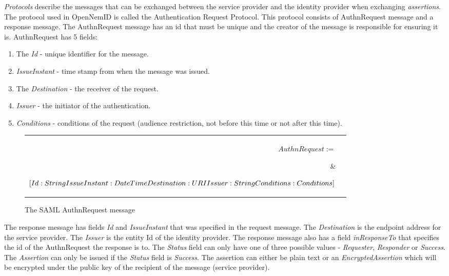 \documentclass[twosided]{report}
\begin{document}
\emph{Protocols} describe the messages that can be exchanged between the service provider and the identity provider when exchanging \emph{assertions}. The protocol used in OpenNemID is called the Authentication Request Protocol. This protocol consists of AuthnRequest message and a response message. The AuthnRequest message has an id that must be unique and the creator of the message is responsible for ensuring it is.
AuthnRequest has 5 fields:
\begin{enumerate}
	\item The \emph{Id} - unique identifier for the message.
	\item \emph{IssueInstant} - time stamp from when the message was issued.
	\item The \emph{Destination} - the receiver of the request.
	\item \emph{Issuer} - the initiator of the authentication.
	\item \emph{Conditions} - conditions of the request (audience restriction, not before this time or not after this time).
\end{enumerate}

\begin{figure}[H]
	\centering
	\begin{tabular}{r l}
	    \parbox[t][][t]{2.4cm}{\raggedleft $AuthnRequest :=$} &
	    \parbox[t][][t]{4.2cm}{
			$[Id : String\\
			IssueInstant : DateTime\\
			Destination : URI\\
			Issuer : String\\
			Conditions : Conditions]$} \\
	\end{tabular}
	\caption{The SAML AuthnRequest message}
\end{figure}

\par
The response message has fields \emph{Id} and \emph{IssueInstant} that was specified in the request message. The \emph{Destination} is the endpoint address for the service provider. The \emph{Issuer} is the entity Id of the identity provider. The response message also has a field \emph{inResponseTo} that specifies the id of the AuthnRequest the response is to. The \emph{Status} field can only have one of three possible values - \emph{Requester}, \emph{Responder} or \emph{Success}. The \emph{Assertion} can only be issued if the \emph{Status} field is \emph{Success}. The assertion can either be plain text or an \emph{EncryptedAssertion} which will be encrypted under the public key of the recipient of the message (service provider).
\end{document}
